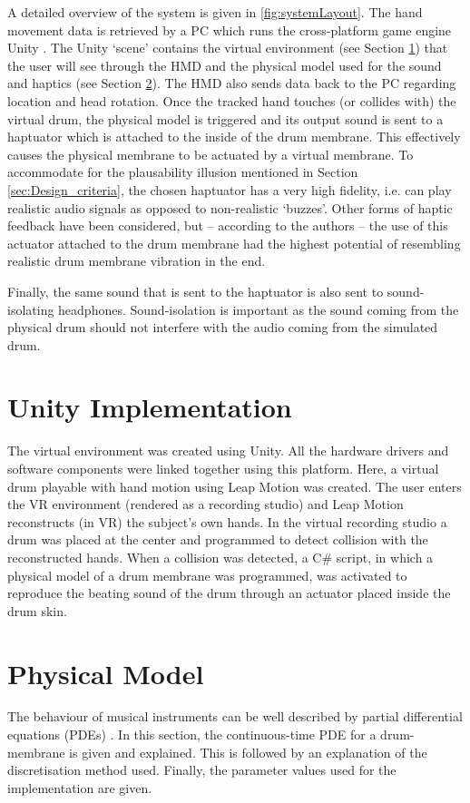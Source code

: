 \documentclass{article}
\begin{document}
A detailed overview of the system is given in \autoref{fig:systemLayout}. The hand movement data is retrieved by a PC which runs the cross-platform game engine Unity \cite{unity}. The Unity `scene' contains the virtual environment (see Section \ref{sec:unity}) that the user will see through the HMD and the physical model used for the sound and haptics (see Section \ref{sec:PM}). The HMD also sends data back to the PC regarding location and head rotation. Once the tracked hand touches (or collides with) the virtual drum, the physical model is triggered and its output sound is sent to a haptuator which is attached to the inside of the drum membrane. This effectively causes the physical membrane to be actuated by a virtual membrane. To accommodate for the plausability illusion mentioned in Section \ref{sec:Design_criteria}, the chosen haptuator has a very high fidelity, i.e. can play realistic audio signals as opposed to non-realistic `buzzes'. Other forms of haptic feedback have been considered, but -- according to the authors -- the use of this actuator attached to the drum membrane had the highest potential of resembling realistic drum membrane vibration in the end.

Finally, the same sound that is sent to the haptuator is also sent to sound-isolating headphones. Sound-isolation is important as the sound coming from the physical drum should not interfere with the audio coming from the simulated drum.

\section{Unity Implementation}\label{sec:unity}
The virtual environment was  created using Unity. All the hardware drivers and software components were linked together using this platform. Here, a virtual drum playable with hand motion using Leap Motion was created. The user enters the VR environment (rendered as a recording studio) and Leap Motion reconstructs (in VR) the subject's own hands. In the virtual recording studio a drum was placed at the center and programmed to detect collision with the reconstructed hands. When a collision was detected, a C\# script, in which a physical model of a drum membrane was programmed, was activated to reproduce the beating sound of the drum through an actuator placed inside the drum skin.

\section{Physical Model}\label{sec:PM}
The behaviour of musical instruments can be well described by partial differential equations (PDEs) \cite{Fletcher1998}. In this section, the continuous-time PDE for a drum-membrane is given and explained. This is followed by an explanation of the discretisation method used. Finally, the parameter values used for the implementation are given. 
\end{document}
